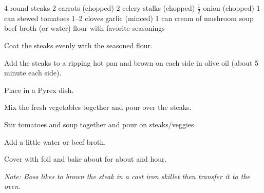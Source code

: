 \dishtype{}
\begin{ingreds}
    4 round steaks
    2 carrots (chopped)
    2 celery stalks (chopped)
    $\frac{1}{2}$ onion (chopped)
    1 can stewed tomatoes
    1--2 cloves garlic (minced)
    1 can cream of mushroom soup
    beef broth (or water)
    flour with favorite seasonings
\end{ingreds}
\begin{method}
    Coat the steaks evenly with the seasoned flour.\par
    Add the steaks to a ripping hot pan and brown on each side in olive oil (about 5 minute each side).\par
    Place in a Pyrex\textsuperscript{\textregistered} dish.\par
    Mix the fresh vegetables together and pour over the steaks.\par
    Stir tomatoes and soup together and pour on steaks/veggies.\par
    Add a little water or beef broth.\par
    Cover with foil and bake about for about and hour.\par
    \emph{Note: Boss likes to brown the steak in a cast iron skillet then transfer it to the oven.}
\end{method}
